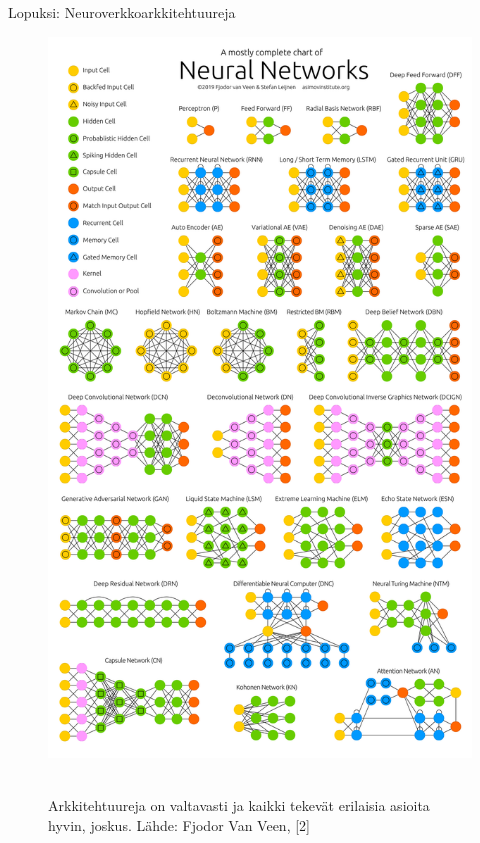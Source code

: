 \documentclass[presentation]{beamer}
\begin{document}
\begin{frame}{Lopuksi: Neuroverkkoarkkitehtuureja}

	\begin{figure}
				\includegraphics[height=0.65\textheight]{NeuralNetworkZo19High.png} \

				\caption*{Arkkitehtuureja on valtavasti ja kaikki tekevät erilaisia asioita hyvin, joskus. Lähde: Fjodor Van Veen, [2]}
	\end{figure}

    
\end{frame}
\end{document}
